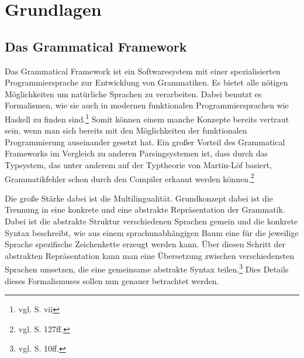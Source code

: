 \documentclass[fontsize=12pt,abstract=on,titlepage,bibliography=totoc,ngerman,listof=totoc]{scrreprt}
\begin{document}
\chapter{Grundlagen}
\label{chap:grundlagen}
\section{Das Grammatical Framework}
\label{sec:gf}
Das Grammatical Framework ist ein Softwaresystem mit einer spezialisierten Programmiersprache zur Entwicklung von Grammatiken. Es bietet alle nötigen Möglichkeiten um natürliche Sprachen zu verarbeiten. Dabei benutzt es Formalismen, wie sie auch in modernen funktionalen Programmiersprachen wie Haskell zu finden sind.\footnote{vgl. \cite{RANTA2011} S. vii} Somit können einem manche Konzepte bereits vertraut sein, wenn man sich bereits mit den Möglichkeiten der funktionalen Programmierung auseinander gesetzt hat. Ein großer Vorteil des Grammatical Frameworks im Vergleich zu anderen Parsingsystemen ist, dass durch das Typsystem, das unter anderem auf der Typtheorie von Martin-Löf basiert, Grammatikfehler schon durch den Compiler erkannt werden können.\footnote{vgl. \cite{RANTA2011} S. 127ff.} \par
Die große Stärke dabei ist die Multilingualität. Grundkonzept dabei ist die Trennung in eine konkrete und eine abstrakte Repräsentation der Grammatik. Dabei ist die abstrakte Struktur verschiedenen Sprachen gemein und die konkrete Syntax beschreibt, wie aus einem sprachunabhängigen Baum eine für die jeweilige Sprache spezifische Zeichenkette erzeugt werden kann. Über diesen Schritt der abstrakten Repräsentation kann man eine Übersetzung zwischen verschiedensten Sprachen umsetzen, die eine gemeinsame abstrakte Syntax teilen.\footnote{vgl. \cite{RANTA2011} S. 10ff.} Dies Details dieses Formalismuses sollen nun genauer betrachtet werden.
\end{document}
